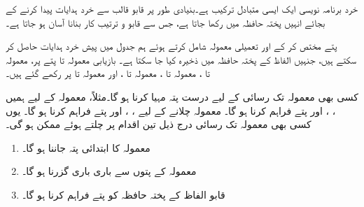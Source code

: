 خرد برنامہ نویسی ایک ایسی  متبادل ترکیب ہے۔بنیادی طور پر  قابو قالب سے خرد ہدایات پیدا کرنے کے بجائے انہیں پختہ حافظہ میں رکھا جاتا ہے، جس  سے  قابو و ترتیب کار بنانا   آسان ہو جاتا ہے۔

پتے مختص کر کے  اور تعمیلی معمولہ شامل کرتے ہوئے ہم جدول  میں پیش خرد ہدایات حاصل کر سکتے ہیں، جنہیں  الفاظ کے پختہ حافظہ میں ذخیرہ کیا جا سکتا ہے۔  بازیابی  معمولہ   تا  پتے پر،  معمولہ  تا ،  معمولہ  تا ،  معمولہ  تا ، اور    معمولہ  تا  پر رکھے گئے ہیں۔

کسی بھی معمولہ تک رسائی کے لیے  درست پتہ  مہیا کرنا ہو گا۔مثلاً،  معمولہ   کے لیے ہمیں ، ، اور  پتے فراہم کرنا ہو گا۔  معمولہ چلانے کے لیے ، ، اور  پتے فراہم کرنا ہو گا۔ یوں کسی بھی معمولہ تک رسائی درج ذیل تین اقدام پر چلتے ہوئے ممکن ہو گی۔
\begin{enumerate}[1.]
\item
معمولہ کا ابتدائی پتہ  جاننا ہو گا۔
\item
معمولہ کے پتوں سے  باری باری   گزرنا ہو گا۔
\item
 قابو الفاظ کے پختہ حافظہ کو پتے  فراہم کرنا ہو گا۔
\end{enumerate}


